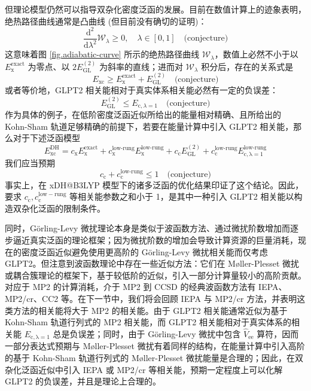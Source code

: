 但理论模型仍然可以指导双杂化密度泛函的发展。目前在数值计算上的迹象表明，绝热路径曲线通常是凸曲线\cite{Frydel-Burke.JCP.2000, Fuchs-Burke.JCP.2005, Teale-Helgaker.JCP.2009,Teale-Helgaker.JCP.2010, Carrascal-Burke.JPCM.2015} (但目前没有确切的证明\cite{Crisostomo-Burke.LMP.2023})：
\begin{equation}
  \frac{\mathrm{d}^2}{\mathrm{d} \lambda^2} \mathcal{W}_{\lambda} \geqslant 0, \quad \lambda \in [0, 1] \quad \text{(conjecture)}
\end{equation}
这意味着图 \ref{fig.adiabatic-curve} 所示的绝热路径曲线 $\mathcal{W}_\lambda$，数值上必然不小于以 $E_\mathrm{x}^\mathrm{exact}$ 为零点、以 $2 E_\mathrm{GL}^{(2)}$ 为斜率的直线；进而对 $\mathcal{W}_\lambda$ 积分后，存在的关系式是
\begin{equation}
  E_\mathrm{xc} \geqslant E_\mathrm{x}^\mathrm{exact} + E_\mathrm{GL}^{(2)} \quad \text{(conjecture)}
\end{equation}
或者等价地，GLPT2 相关能相对于真实体系相关能必然有一定的负误差：
\begin{equation}
  E_\mathrm{GL}^{(2)} \leqslant E_{\mathrm{c}, \lambda=1} \quad \text{(conjecture)}
\end{equation}
作为具体的例子，在低阶密度泛函近似所给出的能量相对精确、且所给出的 Kohn-Sham 轨道足够精确的前提下，若要在能量计算中引入 GLPT2 相关能，那么对于下述泛函模型
\begin{equation*}
  E_\mathrm{xc}^\mathrm{DH} = c_\mathrm{x} E_\mathrm{x}^\mathrm{exact} + c_\mathrm{x}^\text{low-rung} E_\mathrm{x}^\text{low-rung} + c_\mathrm{c} E_\mathrm{GL}^{(2)} + c_\mathrm{c}^\text{low-rung} E_\mathrm{c, \lambda=1}^\text{low-rung}
\end{equation*}
我们应当预期
\begin{equation*}
  c_\mathrm{c} + c_\mathrm{c}^\text{low-rung} \leqslant 1 \quad \text{(conjecture)}
\end{equation*}
事实上，在 xDH@B3LYP 模型下的诸多泛函的优化结果印证了这个结论\cite{Zhang-Xu.JPCL.2021}。因此，要求 $c_\mathrm{c}, c_\mathrm{c}^\mathrm{low-rung}$ 等相关能参数之和小于 1，是其中一种引入 GLPT2 相关能以构造双杂化泛函的限制条件。

同时，G\"orling-Levy 微扰理论本身是类似于波函数方法、通过微扰阶数增加而逐步逼近真实泛函的理论框架；因为微扰阶数的增加会导致计算资源的巨量消耗，现在的密度泛函近似避免使用更高阶的 G\"orling-Levy 微扰相关能而仅考虑 GLPT2。但注意到波函数理论中存在一些近似方法：它们在 M\o{}ller-Plesset 微扰或耦合簇理论的框架下，基于较低阶的近似，引入一部分计算量较小的高阶贡献。对应于 MP2 的计算消耗，介于 MP2 到 CCSD 的经典波函数方法有 IEPA\cite{Sinanoǧlu-Sinanoǧlu.ACP.1964, Nesbet-Nesbet.ACP.1965}、MP2/cr\cite{Dykstra-Davidson.IJQC.2000}、CC2\cite{Christiansen-Joergensen.CPL.1995} 等。在下一节中，我们将会回顾 IEPA 与 MP2/cr 方法，并表明这类方法的相关能将大于 MP2 的相关能。由于 GLPT2 相关能通常近似为基于 Kohn-Sham 轨道行列式的 MP2 相关能，而 GLPT2 相关能相对于真实体系的相关能 $E_\mathrm{c, \lambda=1}$ 总是负误差；同时，由于 G\"orling-Levy 微扰中包含 $\hat V_\mathrm{ee}$ 算符，因而一部分表达式预期与 M\o{}ller-Plesset 微扰有着同样的结构，在能量计算中引入高阶的基于 Kohn-Sham 轨道行列式的 M\o{}ller-Plesset 微扰能量是合理的；因此，在双杂化泛函近似中引入 IEPA 或 MP2/cr 等相关能，预期一定程度上可以化解 GLPT2 的负误差，并且是理论上合理的。

